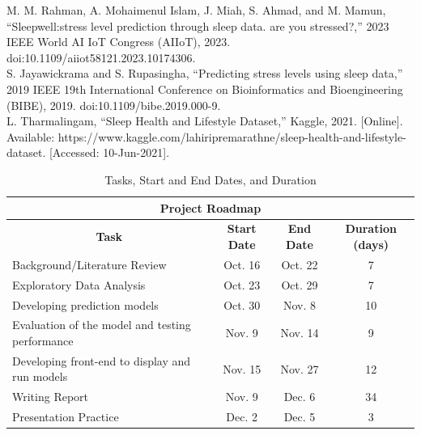 \documentclass[11pt, letterpaper]{article}
\begin{document}
    \begin{thebibliography}{9}
         M. M. Rahman, A. Mohaimenul Islam, J. Miah, S. Ahmad, and M. Mamun, “Sleepwell:stress level prediction through sleep data. are you stressed?,” 2023 IEEE World AI IoT Congress (AIIoT), 2023. doi:10.1109/aiiot58121.2023.10174306.\\

         S. Jayawickrama and S. Rupasingha, “Predicting stress levels using sleep data,” 2019 IEEE 19th International Conference on Bioinformatics and Bioengineering (BIBE), 2019. doi:10.1109/bibe.2019.000-9.\\

         L. Tharmalingam, “Sleep Health and Lifestyle Dataset,” Kaggle, 2021. [Online]. Available: https://www.kaggle.com/lahiripremarathne/sleep-health-and-lifestyle-dataset. [Accessed: 10-Jun-2021].\\

    \end{thebibliography}

    \begin{table}[hbt!]
        \centering
            \begin{tabular}{l|c|c|c}
                \hline \hline
                \multicolumn{4}{c}{\textbf{Project Roadmap}} \\ %
                \hline \hline
                \multicolumn{1}{c|}{\textbf{Task}} & \textbf{Start Date} & \textbf{End Date} & \textbf{Duration (days)} \\
                \hline
                Background/Literature Review & Oct. 16 & Oct. 22 & 7 \\
                \hline
                Exploratory Data Analysis & Oct. 23 & Oct. 29 & 7 \\
                \hline
                Developing prediction models & Oct. 30 & Nov. 8 & 10 \\
                \hline
                Evaluation of the model and testing performance & Nov. 9 & Nov. 14 & 9 \\
                \hline
                Developing front-end to display and run models & Nov. 15 & Nov. 27 & 12 \\
                \hline
                Writing Report & Nov. 9 & Dec. 6 & 34 \\
                \hline
                Presentation Practice & Dec. 2 & Dec. 5 & 3 \\
                \hline \hline
            \end{tabular}
            \caption{Tasks, Start and End Dates, and Duration}
        \label{tab:timeline}
    \end{table}
\end{document}
